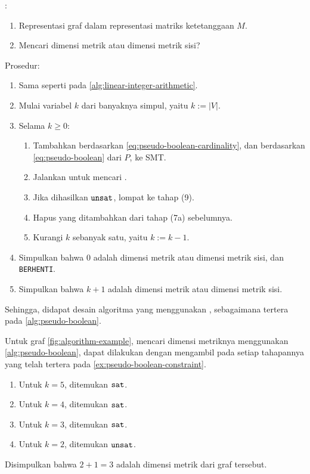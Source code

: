 \vspace{-1em}

\begin{algorithm}[H]
	:
	\begin{enumerate}
		\item Representasi graf dalam representasi matriks ketetanggaan \(M\).
		\item Mencari dimensi metrik atau dimensi metrik sisi?
	\end{enumerate}
	Prosedur:
	\begin{enumerate}
		\item[1--5.] Sama seperti pada \autoref{alg:linear-integer-arithmetic}.
		\setcounter{enumi}{5}
		\item Mulai variabel \(k\) dari banyaknya simpul, yaitu \(k := |V|\).
		\item Selama \(k \geq 0\):
			\begin{enumerate}
					\item Tambahkan  berdasarkan \autoref{eq:pseudo-boolean-cardinality}, dan berdasarkan \autoref{eq:pseudo-boolean} dari \(P\), ke  SMT.
					\item Jalankan  untuk mencari .
					\item Jika dihasilkan \(\mathtt{unsat}\), lompat ke tahap (9).
					\item Hapus  yang ditambahkan dari tahap (7a) sebelumnya.
					\item Kurangi \(k\) sebanyak satu, yaitu \(k := k - 1\).
			\end{enumerate}
		\item Simpulkan bahwa 0 adalah dimensi metrik atau dimensi metrik sisi, dan \texttt{BERHENTI}.
		\item Simpulkan bahwa \(k + 1\) adalah dimensi metrik atau dimensi metrik sisi.
	\end{enumerate}
	\caption{}
	\label{alg:pseudo-boolean}
\end{algorithm}

\vspace{-1em}

Sehingga, didapat desain algoritma yang menggunakan , sebagaimana tertera pada \autoref{alg:pseudo-boolean}.

\begin{example}
	Untuk graf \autoref{fig:algorithm-example}, mencari dimensi metriknya menggunakan \autoref{alg:pseudo-boolean}, dapat dilakukan dengan mengambil pada setiap tahapannya  yang telah tertera pada \autoref{ex:pseudo-boolean-constraint}.
	\begin{enumerate}
		\item Untuk \(k = 5\), ditemukan \(\mathtt{sat}\).
		\item Untuk \(k = 4\), ditemukan \(\mathtt{sat}\).
		\item Untuk \(k = 3\), ditemukan \(\mathtt{sat}\).
		\item Untuk \(k = 2\), ditemukan \(\mathtt{unsat}\).
	\end{enumerate}
	Disimpulkan bahwa \(2 + 1 = 3\) adalah dimensi metrik dari graf tersebut.
\end{example}

